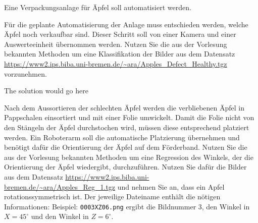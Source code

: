 \documentclass{oxmathproblems}
\begin{document}
Eine Verpackungsanlage für Äpfel soll automatisiert werden.  
\begin{questions}
\miquestion
Für die geplante Automatisierung der Anlage muss entschieden werden, welche Äpfel noch verkaufbar sind. Dieser Schritt soll von einer Kamera und einer Auswerteeinheit übernommen werden. Nutzen Sie die aus der Vorlesung bekannten Methoden um eine Klassifikation der Bilder aus dem Datensatz \url{https://www2.ips.biba.uni-bremen.de/~ara/Apples_Defect_Healthy.tgz} vorzunehmen.

\begin{solution}
  The solution would go here
\end{solution}

\miquestion
Nach dem Aussortieren der schlechten Äpfel werden die verbliebenen Äpfel in Pappschalen einsortiert und mit einer Folie umwickelt. Damit die Folie nicht von den Stängeln der Äpfel durchstochen wird, müssen diese entsprechend platziert werden. Ein Roboterarm soll die automatische Platzierung übernehmen und benötigt dafür die Orientierung der Äpfel auf dem Förderband. Nutzen Sie die aus der Vorlesung bekannten Methoden um eine Regression des Winkels, der die Orientierung der Äpfel wiedergibt, durchzuführen. Nutzen Sie dafür die Bilder aus dem Datensatz \url{https://www2.ips.biba.uni-bremen.de/~ara/Apples_Reg_1.tgz} und nehmen Sie an, dass ein Apfel rotationssymmetrisch ist. Der jeweilige Dateiname enthält die nötigen Informationen:
Beispiel: \texttt{0003\textunderscore X\textunderscore Z\textunderscore 06.png} ergibt die Bildnummer 3, den Winkel in $X = 45^{\circ}$ und den Winkel in $Z = 6^{\circ}$.
\begin{parts}

\end{parts}
\end{questions}
\end{document}
